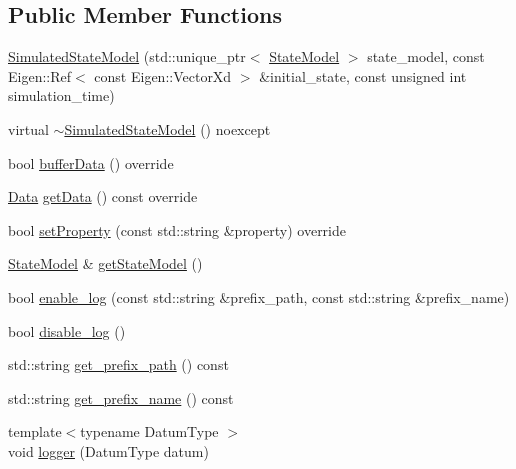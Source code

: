 \subsection*{Public Member Functions}
\begin{DoxyCompactItemize}
\item 
\mbox{\hyperlink{classbfl_1_1SimulatedStateModel_a46fd7b491ec8e7e152faa07f9d46f815}{Simulated\+State\+Model}} (std\+::unique\+\_\+ptr$<$ \mbox{\hyperlink{classbfl_1_1StateModel}{State\+Model}} $>$ state\+\_\+model, const Eigen\+::\+Ref$<$ const Eigen\+::\+Vector\+Xd $>$ \&initial\+\_\+state, const unsigned int simulation\+\_\+time)
\item 
virtual \mbox{\hyperlink{classbfl_1_1SimulatedStateModel_a5158e3a4a42075325e26cad6f1a63434}{$\sim$\+Simulated\+State\+Model}} () noexcept
\item 
bool \mbox{\hyperlink{classbfl_1_1SimulatedStateModel_ae7bc3a9bf9d4ed8a8d1985772380295e}{buffer\+Data}} () override
\item 
\mbox{\hyperlink{namespacebfl_af6b103c6821db1b54452f776fdd9dd02}{Data}} \mbox{\hyperlink{classbfl_1_1SimulatedStateModel_a23aa6df27179a9a48b48cf4002508ba9}{get\+Data}} () const override
\item 
bool \mbox{\hyperlink{classbfl_1_1SimulatedStateModel_ab629cfc5e8db969760f5fa161a1cf360}{set\+Property}} (const std\+::string \&property) override
\item 
\mbox{\hyperlink{classbfl_1_1StateModel}{State\+Model}} \& \mbox{\hyperlink{classbfl_1_1SimulatedStateModel_a294e8a17e51310218295945276021f2f}{get\+State\+Model}} ()
\item 
bool \mbox{\hyperlink{classbfl_1_1Logger_ae94b97b6e8d7902e8ce048384813122e}{enable\+\_\+log}} (const std\+::string \&prefix\+\_\+path, const std\+::string \&prefix\+\_\+name)
\item 
bool \mbox{\hyperlink{classbfl_1_1Logger_a440467a28ccc46490d767fe0ef6f556a}{disable\+\_\+log}} ()
\item 
std\+::string \mbox{\hyperlink{classbfl_1_1Logger_a56cf1a4e712bf23d9978420a8a59a62b}{get\+\_\+prefix\+\_\+path}} () const
\item 
std\+::string \mbox{\hyperlink{classbfl_1_1Logger_a913a795b7bfbf378815eeb342d68a7c0}{get\+\_\+prefix\+\_\+name}} () const
\item 
{\footnotesize template$<$typename Datum\+Type $>$ }\\void \mbox{\hyperlink{classbfl_1_1Logger_a1033ff31398484f2132f84fd140da9e3}{logger}} (Datum\+Type datum)
\item 

\end{DoxyCompactItemize}
